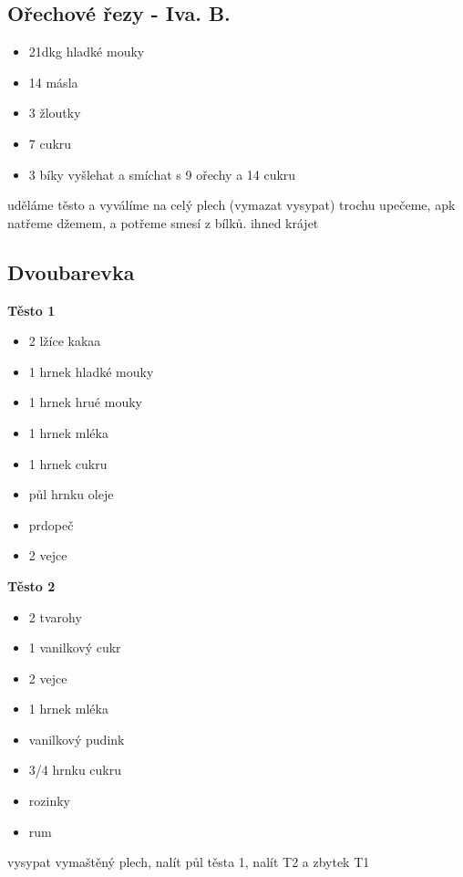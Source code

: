 \documentclass[10pt,a4paper]{article}
\newenvironment{myitemize}
{ \begin{itemize}
    \setlength{\itemsep}{0pt}
    \setlength{\parskip}{0pt}
    \setlength{\parsep}{0pt}     }
{ \end{itemize}                  }
\begin{document}
\subsection{Ořechové řezy - Iva. B.}
\begin{minipage}[t]{0,5\textwidth}
\begin{myitemize} 
\item 21dkg hladké mouky
\item 14 másla
\item 3 žloutky
\item 7 cukru
\item3 bíky vyšlehat a smíchat s 9 ořechy a 14 cukru
\end{myitemize}
\end{minipage}
\begin{minipage}[t]{0,5\textwidth}
uděláme těsto a vyválíme na celý plech (vymazat vysypat) trochu upečeme, apk natřeme džemem, a potřeme smesí z bílků. ihned krájet
\end{minipage}
\subsection{Dvoubarevka}
\begin{minipage}[t]{0,5\textwidth}
\textbf{Těsto 1}
\begin{myitemize} 
\item 2 lžíce kakaa
\item 1 hrnek hladké mouky
\item 1 hrnek hrué mouky
\item 1 hrnek mléka
\item 1 hrnek cukru
\item půl hrnku oleje
\item prdopeč
\item 2 vejce
\end{myitemize}
\end{minipage}
\begin{minipage}[t]{0,5\textwidth}
\textbf{Těsto 2}
\begin{myitemize} 
\item 2 tvarohy
\item 1 vanilkový cukr
\item 2 vejce
\item 1 hrnek mléka
\item vanilkový pudink
\item 3/4 hrnku cukru
\item rozinky
\item rum
\end{myitemize}
vysypat vymaštěný plech, nalít půl těsta 1, nalít T2 a zbytek T1
\end{minipage}
\end{document}

